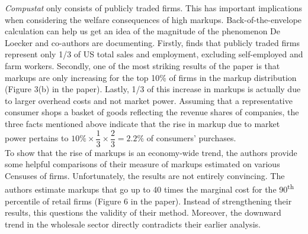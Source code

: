 \documentclass{amsart}
\theoremstyle{definition}
\theoremstyle{remark}
\numberwithin{equation}{section}
\begin{document}
\textit{Compustat} only consists of publicly traded firms. This has important implications when considering the welfare consequences of high markups. Back-of-the-envelope calculation can help us get an idea of the magnitude of the phenomenon De Loecker and co-authors are documenting. Firstly, \cite{davis2006volatility} finds that publicly traded firms represent only 1/3 of US total sales and employment, excluding self-employed and farm workers. Secondly, one of the most striking results of the paper is that markups are only increasing for the top 10\% of firms in the markup distribution (Figure 3(b) in the paper). Lastly, 1/3 of this increase in markups is actually due to larger overhead costs and not market power. Assuming that a representative consumer shops a basket of goods reflecting the revenue shares of companies, the three facts mentioned above indicate that the rise in markup due to market power pertains to $10\% \times \dfrac{1}{3} \times \dfrac{2}{3} = 2.2\%$ of consumers' purchases.\\

To show that the rise of markups is an economy-wide trend, the authors provide some helpful comparisons of their measure of markups estimated on various Censuses of firms. Unfortunately, the results are not entirely convincing. The authors estimate markups that go up to 40 times the marginal cost for the 90\textsuperscript{th} percentile of retail firms (Figure 6 in the paper). Instead of strengthening their results, this questions the validity of their method. Moreover, the downward trend in the wholesale sector directly contradicts their earlier analysis.







\end{document}
